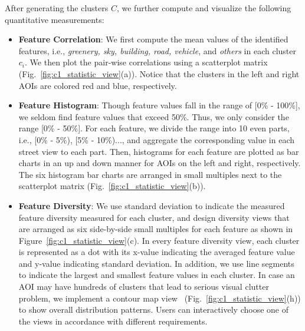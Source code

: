 \vspace*{2mm}
After generating the clusters $C$, we further compute and visualize the following quantitative measurements:

\vspace*{-2mm}
\begin{itemize}

\item
\textbf{Feature Correlation}:
We first compute the mean values of the identified features, i.e., \textit{greenery, sky, building, road, vehicle}, and \textit{others} in each cluster $c_i$.
We then plot the pair-wise correlations using a scatterplot matrix (Fig.~\ref{fig:c1_statistic_view}(a)).
Notice that the clusters in the left and right AOIs are colored red and blue, respectively.

\vspace*{-1mm}
\item
\textbf{Feature Histogram}:
Though feature values fall in the range of [0\% - 100\%], we seldom find feature values that exceed 50\%.
Thus, we only consider the range [0\% - 50\%].
For each feature, we divide the range into 10 even parts, i.e., [0\% - 5\%), [5\% - 10\%)..., and aggregate the corresponding value in each street view to each part.
Then, histograms for each feature are plotted as bar charts in an up and down manner for AOIs on the left and right, respectively.
The six histogram bar charts are arranged in small multiples next to the scatterplot matrix (Fig.~\ref{fig:c1_statistic_view}(b)).

\vspace*{-1mm}
\item
\textbf{Feature Diversity}:
We use standard deviation to indicate the measured feature diversity measured for each cluster, and design diversity views that are arranged as six side-by-side small multiples for each feature as shown in Figure~\ref{fig:c1_statistic_view}(c).
In every feature diversity view, each cluster is represented as a dot with its x-value indicating the averaged feature value and y-value indicating standard deviation.
In addition, we use line segments to indicate the largest and smallest feature values in each cluster. 
In case an AOI may have hundreds of clusters that lead to serious visual clutter problem, we implement a contour map view~\cite{chen2014visual} (Fig.~\ref{fig:c1_statistic_view}(h)) to show overall distribution patterns.
Users can interactively choose one of the views in accordance with different requirements.

\end{itemize}

